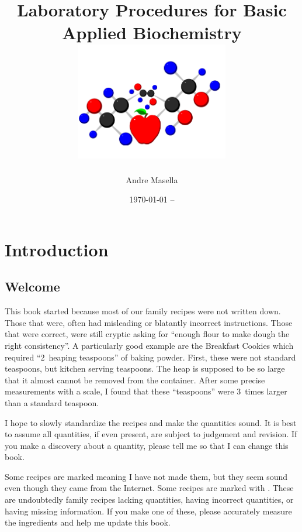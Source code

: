 \documentclass{book}
\begin{document}
\pagestyle{fancy}

\frontmatter
\thispagestyle{plain}

\title{Laboratory Procedures for Basic Applied Biochemistry \\
\includegraphics[width=0.5\textwidth]{CoverLogo}}
\author{Andre Masella}
\date{\today{} -- }
\maketitle

\tableofcontents

\chapter{Introduction}

\section{Welcome} 
This book started because most of our family recipes were not written down. Those that were, often had misleading or blatantly incorrect instructions. Those that were correct, were still cryptic asking for ``enough flour to make dough the right consistency''. A particularly good example are the Breakfast Cookies which required ``2~heaping teaspoons'' of baking powder. First, these were not standard teaspoons, but kitchen serving teaspoons. The heap is supposed to be so large that it almost cannot be removed from the container. After some precise measurements with a scale, I found that these ``teaspoons'' were 3~times larger than a standard teaspoon.

I hope to slowly standardize the recipes and make the quantities sound. It is best to assume all quantities, if even present, are subject to judgement and revision. If you make a discovery about a quantity, please tell me so that I can change this book.

Some recipes are marked \UNTESTED{} meaning I have not made them, but they seem sound even though they came from the Internet. Some recipes are marked with \FIXME{}. These are undoubtedly family recipes lacking quantities, having incorrect quantities, or having missing information. If you make one of these, please accurately measure the ingredients and help me update this book.
\end{document}
